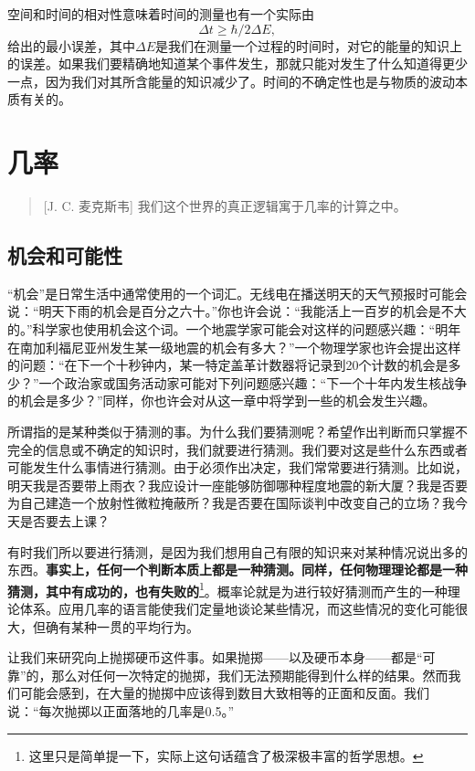 \documentclass[12pt,oneside]{book}
\begin{document}
\begin{common-format}
空间和时间的相对性意味着时间的测量也有一个实际由
\begin{equation*}
\Delta t\geq\hbar/2\Delta E,
\end{equation*}
给出的最小误差，其中$\Delta E$是我们在测量一个过程的时间时，对它的能量的知识上的误差。如果我们要精确地知道某个事件发生，那就只能对发生了什么知道得更少一点，因为我们对其所含能量的知识减少了。时间的不确定性也是与物质的波动本质有关的。



\chapter{几率}
\begin{quote}[J. C. 麦克斯韦]
我们这个世界的真正逻辑寓于几率的计算之中。
\end{quote}

\section{机会和可能性}
“机会”是日常生活中通常使用的一个词汇。无线电在播送明天的天气预报时可能会说：“明天下雨的机会是百分之六十。”你也许会说：“我能活上一百岁的机会是不大的。”科学家也使用机会这个词。一个地震学家可能会对这样的问题感兴趣：“明年在南加利福尼亚州发生某一级地震的机会有多大？”一个物理学家也许会提出这样的问题：“在下一个十秒钟内，某一特定盖革计数器将记录到20个计数的机会是多少？”一个政治家或国务活动家可能对下列问题感兴趣：“下一个十年内发生核战争的机会是多少？”同样，你也许会对从这一章中将学到一些的机会发生兴趣。

所谓指的是某种类似于猜测的事。为什么我们要猜测呢？希望作出判断而只掌握不完全的信息或不确定的知识时，我们就要进行猜测。我们要对这是些什么东西或者可能发生什么事情进行猜测。由于必须作出决定，我们常常要进行猜测。比如说，明天我是否要带上雨衣？我应设计一座能够防御哪种程度地震的新大厦？我是否要为自己建造一个放射性微粒掩蔽所？我是否要在国际谈判中改变自己的立场？我今天是否要去上课？

有时我们所以要进行猜测，是因为我们想用自己有限的知识来对某种情况说出多的东西。\textbf{事实上，任何一个判断本质上都是一种猜测。同样，任何物理理论都是一种猜测，其中有成功的，也有失败的}\footnote{这里只是简单提一下，实际上这句话蕴含了极深极丰富的哲学思想。}。概率论就是为进行较好猜测而产生的一种理论体系。应用几率的语言能使我们定量地谈论某些情况，而这些情况的变化可能很大，但确有某种一贯的平均行为。

让我们来研究向上抛掷硬币这件事。如果抛掷——以及硬币本身——都是“可靠”的，那么对任何一次特定的抛掷，我们无法预期能得到什么样的结果。然而我们可能会感到，在大量的抛掷中应该得到数目大致相等的正面和反面。我们说：“每次抛掷以正面落地的几率是0.5。”


\end{common-format}
\end{document}
